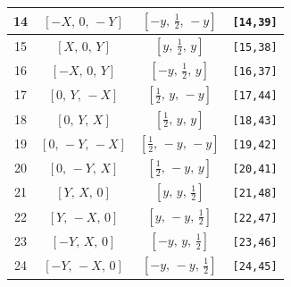 \documentclass[fleqn,8pt]{jsarticle}
\begin{document}
\begin{longtable}{cccc}
14 & $\left[ - X,\, 0,\, - Y \right]$ & $\left[ - y,\, \frac{1}{2},\, - y \right]$ & {\tt [14,39]} \\ \hline
15 & $\left[ X,\, 0,\, Y \right]$ & $\left[ y,\, \frac{1}{2},\, y \right]$ & {\tt [15,38]} \\ \hline
16 & $\left[ - X,\, 0,\, Y \right]$ & $\left[ - y,\, \frac{1}{2},\, y \right]$ & {\tt [16,37]} \\ \hline
17 & $\left[ 0,\, Y,\, - X \right]$ & $\left[ \frac{1}{2},\, y,\, - y \right]$ & {\tt [17,44]} \\ \hline
18 & $\left[ 0,\, Y,\, X \right]$ & $\left[ \frac{1}{2},\, y,\, y \right]$ & {\tt [18,43]} \\ \hline
19 & $\left[ 0,\, - Y,\, - X \right]$ & $\left[ \frac{1}{2},\, - y,\, - y \right]$ & {\tt [19,42]} \\ \hline
20 & $\left[ 0,\, - Y,\, X \right]$ & $\left[ \frac{1}{2},\, - y,\, y \right]$ & {\tt [20,41]} \\ \hline
21 & $\left[ Y,\, X,\, 0 \right]$ & $\left[ y,\, y,\, \frac{1}{2} \right]$ & {\tt [21,48]} \\ \hline
22 & $\left[ Y,\, - X,\, 0 \right]$ & $\left[ y,\, - y,\, \frac{1}{2} \right]$ & {\tt [22,47]} \\ \hline
23 & $\left[ - Y,\, X,\, 0 \right]$ & $\left[ - y,\, y,\, \frac{1}{2} \right]$ & {\tt [23,46]} \\ \hline
24 & $\left[ - Y,\, - X,\, 0 \right]$ & $\left[ - y,\, - y,\, \frac{1}{2} \right]$ & {\tt [24,45]} \\
\end{longtable}
\renewcommand{\arraystretch}{1.2}
\end{document}
